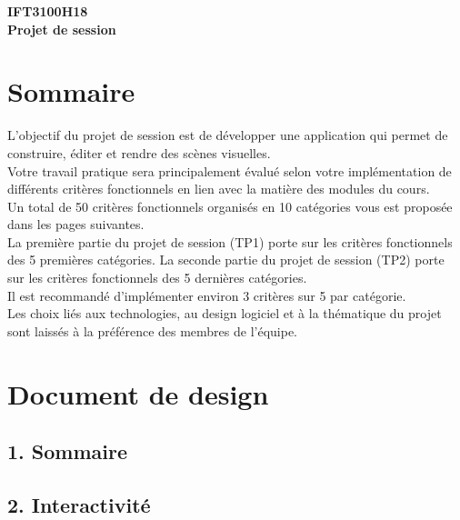 \documentclass[12pt]{article}
\newcommand{\state}{\noindent}
\newcommand{\substate}{\nolinebreak}
\begin{document}
\begin{center}
  \scriptsize
  \textbf{IFT3100H18\\}
  \textbf{Projet de session\\}
\end{center}

\section*{Sommaire}

\state
L'objectif du projet de session est de développer une application qui permet de construire, éditer et rendre des scènes visuelles.\\

\state
Votre travail pratique sera principalement évalué selon votre implémentation de différents critères fonctionnels en lien avec la matière des modules du cours. \\

\state
Un total de 50 critères fonctionnels organisés en 10 catégories vous est proposée dans les pages suivantes. \\

\state
La première partie du projet de session (TP1) porte sur les critères fonctionnels des 5 premières catégories.
\substate
La seconde partie du projet de session (TP2) porte sur les critères fonctionnels des 5 dernières catégories. \\

\state
Il est recommandé d'implémenter environ 3 critères sur 5 par catégorie. \\

\state
Les choix liés aux technologies, au design logiciel et à la thématique du projet sont laissés à la préférence des membres de l'équipe. \\

\pagebreak

\section*{Document de design}

\subsection*{1. Sommaire}

\subsection*{2. Interactivité}
\end{document}

